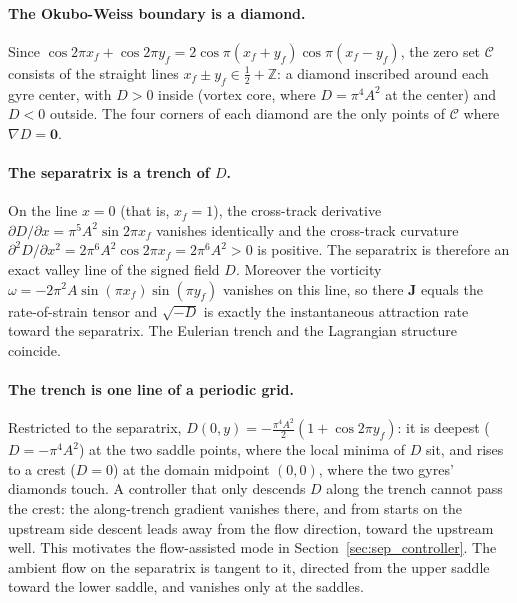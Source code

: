 \documentclass[12pt, letterpaper, oneside]{report}
\begin{document}
\paragraph{The Okubo-Weiss boundary is a diamond.} Since
$\cos2\pi x_f+\cos2\pi y_f=2\cos\pi(x_f+y_f)\cos\pi(x_f-y_f)$, the zero set
$\mathcal{C}$ consists of the straight lines
$x_f\pm y_f\in\tfrac12+\mathbb{Z}$: a diamond inscribed around each gyre
center, with $D>0$ inside (vortex core, where $D=\pi^4A^2$ at the center)
and $D<0$ outside. The four corners of each diamond are the only points of
$\mathcal{C}$ where $\nabla D=\mathbf{0}$.

\paragraph{The separatrix is a trench of $D$.} On the line $x=0$ (that is,
$x_f=1$), the cross-track derivative
$\partial D/\partial x=\pi^5A^2\sin2\pi x_f$ vanishes identically and the
cross-track curvature
$\partial^2D/\partial x^2=2\pi^6A^2\cos2\pi x_f=2\pi^6A^2>0$ is positive.
The separatrix is therefore an exact valley line of the signed field $D$.
Moreover the vorticity $\omega=-2\pi^2A\sin(\pi x_f)\sin(\pi y_f)$ vanishes
on this line, so there $\mathbf{J}$ equals the rate-of-strain tensor and
$\sqrt{-D}$ is exactly the instantaneous attraction rate toward the
separatrix. The Eulerian trench and the Lagrangian structure coincide.

\paragraph{The trench is one line of a periodic grid.} Restricted to the
separatrix, $D(0,y)=-\tfrac{\pi^4A^2}{2}(1+\cos2\pi y_f)$: it is deepest
($D=-\pi^4A^2$) at the two saddle points, where the local minima of $D$
sit, and rises to a crest ($D=0$) at the domain midpoint $(0,0)$, where the
two gyres' diamonds touch. A controller that only descends $D$ along the
trench cannot pass the crest: the along-trench gradient vanishes there,
and from starts on the upstream side descent leads away from the flow
direction, toward the upstream well. This motivates the flow-assisted mode
in Section~\ref{sec:sep_controller}. The ambient flow on the separatrix is
tangent to it, directed from the upper saddle toward the lower saddle, and
vanishes only at the saddles.
\end{document}
